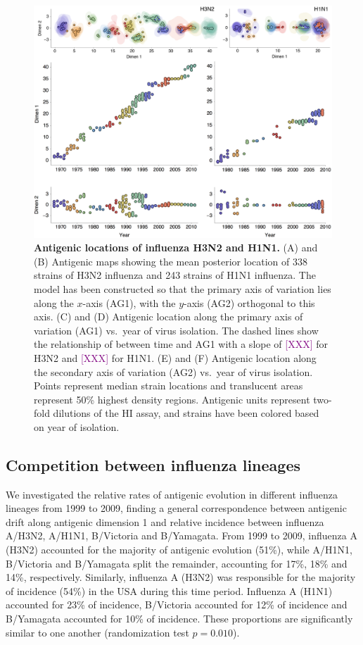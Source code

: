 \documentclass[11pt,oneside,letterpaper]{article}
\def\tbc#1{\textcolor{purple}{[#1]}}
\begin{document}
\begin{figure}[tb]
	\centering		
	\includegraphics[width=\textwidth]{figures/flu_grid}
	\caption{\textbf{Antigenic locations of influenza H3N2 and H1N1.} 
	(A) and (B) Antigenic maps showing the mean posterior location of 338 strains of H3N2 influenza and 243 strains of H1N1 influenza.  
	The model has been constructed so that the primary axis of variation lies along the $x$-axis (AG1), with the $y$-axis (AG2) orthogonal to this axis.  
	(C) and (D) Antigenic location along the primary axis of variation (AG1) vs.\ year of virus isolation.  
	The dashed lines show the relationship of between time and AG1 with a slope of \tbc{XXX} for H3N2 and \tbc{XXX} for H1N1.  
	(E) and (F) Antigenic location along the secondary axis of variation (AG2) vs.\ year of virus isolation.  
	Points represent median strain locations and translucent areas represent 50\% highest density regions.
	Antigenic units represent two-fold dilutions of the HI assay, and strains have been colored based on year of isolation.} 
	\label{flu_grid} 
\end{figure}

\subsection*{Competition between influenza lineages}

We investigated the relative rates of antigenic evolution in different influenza lineages from 1999 to 2009, finding a general correspondence between antigenic drift along antigenic dimension 1 and relative incidence between influenza A/H3N2, A/H1N1, B/Victoria and B/Yamagata.
From 1999 to 2009, influenza A (H3N2) accounted for the majority of antigenic evolution (51\%), while A/H1N1, B/Victoria and B/Yamagata split the remainder, accounting for 17\%, 18\% and 14\%, respectively.
Similarly, influenza A (H3N2) was responsible for the majority of incidence (54\%) in the USA during this time period.
Influenza A (H1N1) accounted for 23\% of incidence, B/Victoria accounted for 12\% of incidence and B/Yamagata accounted for 10\% of incidence.
These proportions are significantly similar to one another (randomization test $p = 0.010$).
\end{document}
